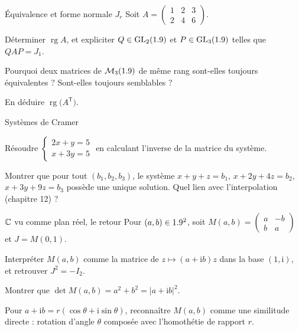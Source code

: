 \begin{exercice}[2]{Équivalence et forme normale $J_r$}
Soit $A=\begin{pmatrix}1&2&3\\2&4&6\end{pmatrix}$.
\begin{questions}
  \item Déterminer $\operatorname{rg}A$, et expliciter
    $Q\in\operatorname{GL}_2(1.9)$ et $P\in\operatorname{GL}_3(1.9)$ telles
    que $QAP=J_1$.
  \item Pourquoi deux matrices de $\mathcal{M}_{3}(1.9)$ de même rang
    sont-elles toujours équivalentes ? Sont-elles toujours semblables ?
  \item En déduire $\operatorname{rg}\bigl(A^{\mathsf T}\bigr)$.
\end{questions}
\end{exercice}

\begin{exercice}[2]{Systèmes de Cramer}
\begin{questions}
  \item Résoudre $\begin{cases}2x+y=5\\x+3y=5\end{cases}$ en calculant
    l'inverse de la matrice du système.
  \item Montrer que pour tout $(b_1,b_2,b_3)$, le système
    $x+y+z=b_1$, $x+2y+4z=b_2$, $x+3y+9z=b_3$ possède une unique
    solution. Quel lien avec l'interpolation (chapitre 12) ?
\end{questions}
\end{exercice}

\begin{exercice}[2]{$\mathbb{C}$ vu comme plan réel, le retour}
Pour $(a,b)\in1.9^{2}$, soit $M(a,b)=\begin{pmatrix}a&-b\\b&a\end{pmatrix}$
et $J=M(0,1)$.
\begin{questions}
  \item Interpréter $M(a,b)$ comme la matrice de $z\mapsto(a+\mathrm{i}b)z$
    dans la base $(1,\mathrm{i})$, et retrouver $J^{2}=-I_2$.
  \item Montrer que $\det M(a,b)=a^{2}+b^{2}=|a+\mathrm{i}b|^{2}$.
  \item Pour $a+\mathrm{i}b=r(\cos\theta+\mathrm{i}\sin\theta)$,
    reconnaître $M(a,b)$ comme une similitude directe : rotation d'angle
    $\theta$ composée avec l'homothétie de rapport $r$.
\end{questions}
\end{exercice}

